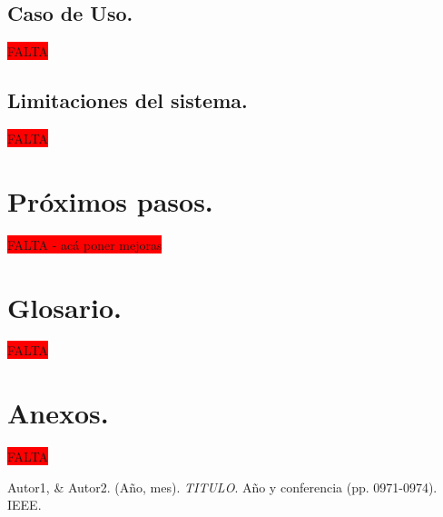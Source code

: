 \documentclass[12pt,a4paper]{article}
\begin{document}
\subsection{Caso de Uso.}
\colorbox{red}{FALTA}

\subsection{Limitaciones del sistema.}
\colorbox{red}{FALTA}
 
\section{Próximos pasos.}  
\colorbox{red}{FALTA - acá poner mejoras}

\section{Glosario.}
\colorbox{red}{FALTA}

\section{Anexos.}
\colorbox{red}{FALTA}
\cleardoublepage


\begin{thebibliography}{9}
Autor1, \& Autor2. (Año, mes). \textit{TITULO}. Año y conferencia (pp. 0971-0974). IEEE.

\end{thebibliography}
\end{document}
